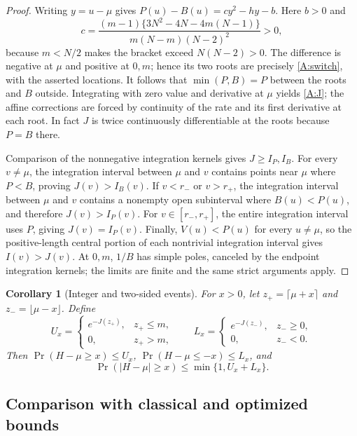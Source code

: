\documentclass[11pt,a4paper]{article}
\newtheorem{corollary}[theorem]{Corollary}
\begin{document}
\begin{proof}
Writing $y=u-\mu$ gives $P(u)-B(u)=cy^2-hy-b$.
Here $b>0$ and
\[
 c=\frac{(m-1)\{3N^2-4N-4m(N-1)\}}
 {m(N-m)(N-2)^2}>0,
\]
because $m<N/2$ makes the bracket exceed $N(N-2)>0$.
The difference is negative at $\mu$ and positive at $0,m$; hence its
two roots are precisely \eqref{A:switch}, with the asserted locations.
It follows that $\min(P,B)=P$ between the roots and $B$ outside.
Integrating with zero value and derivative at $\mu$ yields \eqref{A:J};
the affine corrections are forced by continuity of the rate and its
first derivative at each root. In fact $J$ is twice continuously
differentiable at the roots because $P=B$ there.

Comparison of the nonnegative integration kernels gives $J\ge I_P,I_B$.
For every $v\ne\mu$, the integration interval between $\mu$ and $v$ contains points near $\mu$ where $P<B$, proving
$J(v)>I_B(v)$. If $v<r_-$ or $v>r_+$, the integration interval between $\mu$ and $v$ contains a nonempty open subinterval where $B(u)<P(u)$, and therefore $J(v)>I_P(v)$. For $v\in[r_-,r_+]$, the entire integration interval uses $P$, giving $J(v)=I_P(v)$. Finally, $V(u)<P(u)$ for every $u\ne\mu$,
so the positive-length central portion of each nontrivial integration interval gives $I(v)>J(v)$.
At $0,m$, $1/B$ has simple poles, canceled by the endpoint integration
kernels; the limits are finite and the same strict arguments apply.
\end{proof}

\begin{corollary}[Integer and two-sided events]
For $x>0$, let $z_+=\lceil\mu+x\rceil$ and $z_-=\lfloor\mu-x\rfloor$. Define
\[
 U_x=\begin{cases}e^{-J(z_+)},&z_+\le m,\\0,&z_+>m,\end{cases}
 \qquad
 L_x=\begin{cases}e^{-J(z_-)},&z_-\ge0,\\0,&z_-<0.\end{cases}
\]
Then $\Pr(H-\mu\ge x)\le U_x$, $\Pr(H-\mu\le-x)\le L_x$, and
\[
 \Pr(|H-\mu|\ge x)\le\min\{1,U_x+L_x\}.
\]
\end{corollary}

\subsection{Comparison with classical and optimized bounds}
\end{document}

